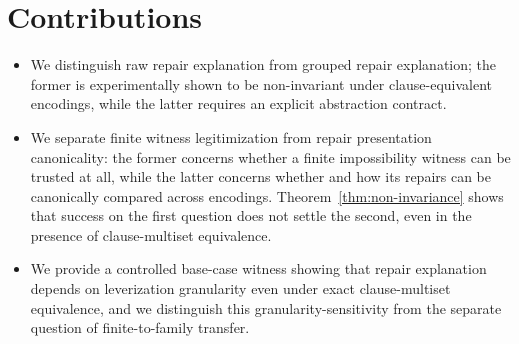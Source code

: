 \section{Contributions}
\label{sec:contributions}

\begin{itemize}[leftmargin=1.5em]
\item We distinguish raw repair explanation from grouped repair explanation; the former is experimentally shown to be non-invariant under clause-equivalent encodings, while the latter requires an explicit abstraction contract.

\item We separate finite witness legitimization from repair presentation canonicality: the former concerns whether a finite impossibility witness can be trusted at all, while the latter concerns whether and how its repairs can be canonically compared across encodings. Theorem~\ref{thm:non-invariance} shows that success on the first question does not settle the second, even in the presence of clause-multiset equivalence.

\item We provide a controlled base-case witness showing that repair explanation depends on leverization granularity even under exact clause-multiset equivalence, and we distinguish this granularity-sensitivity from the separate question of finite-to-family transfer.
\end{itemize}
